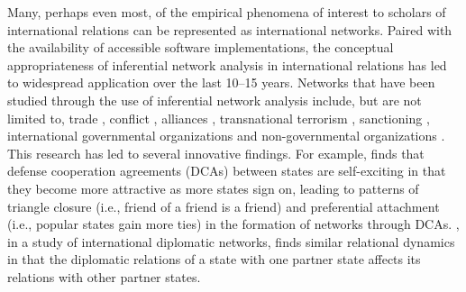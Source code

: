 \documentclass[fleqn,12pt]{wlscirep}
\begin{document}
Many, perhaps even most, of the empirical phenomena of interest to scholars of international relations can be represented as international networks. Paired with the availability of accessible software implementations, the conceptual appropriateness of inferential network analysis in international relations has led to widespread application over the last 10--15 years. Networks that have been studied through the use of inferential network analysis include, but are not limited to, trade \citep{ward2007persistent,fagiolo2014does,chu2010homogenization,chyzh2016dangerous}, conflict \citep{ward2007disputes,cranmer2011inferential,gallop2016endogenous,dorff2013networks}, alliances \citep{cranmer2012complex}, transnational terrorism \citep{desmarais2013forecasting,asal2016friends,metternich2013antigovernment,bush2015measuring}, sanctioning \citep{cranmer2014reciprocity,dorff2017states}, international governmental organizations \citep{davis2017forces,cao2012global,lupu2017networked}and non-governmental organizations \citep{atouba2015international}. This research has led to several innovative findings. For example, \cite{kinne2018defense} finds that defense cooperation agreements (DCAs) between states are self-exciting in that they become more attractive as more states sign on, leading to patterns of triangle closure (i.e., friend of a friend is a friend) and preferential attachment (i.e., popular states gain more ties) in the formation of networks through DCAs. \cite{duque2018recognizing}, in a study of international diplomatic networks, finds similar relational dynamics in that the diplomatic relations of a state with one partner state affects its relations with other partner states.
 
\end{document}
